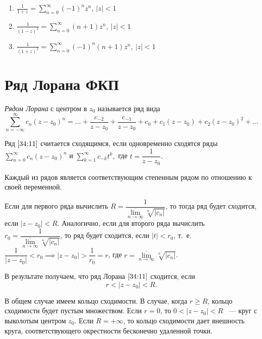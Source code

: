 \documentclass[../../main.tex]{subfiles}
\begin{document}
\begin{rems}
\begin{enumerate}
\begin{enumerate}
			\item $\displaystyle \frac{1}{1 + z} = \sum\limits_{n = 0}^{\infty} (-1)^nz^n,\  |z| < 1$
			
			\item $\displaystyle \frac{1}{(1 - z)^2} = \sum\limits_{n = 0}^{\infty} (n + 1)z^n,\ |z| < 1$
			
			\item $\displaystyle \frac{1}{(1 + z)^2} = \sum\limits_{n = 0}^{\infty} (-1)^n(n + 1)z^n,\ |z| < 1$
		\end{enumerate}
	\end{enumerate}
\end{rems}

\section{Ряд Лорана ФКП}

\emph{Рядом Лорана} с центром в $ z_0 $ называется ряд вида
\begin{equation}\label{34:11}
	\sum\limits_{n = -\infty}^{\infty}c_n(z - z_0)^n = \ldots + \frac{c_{-2}}{z - 
	z_0} + \frac{c_{-1}}{z - z_0} + c_0 + c_1(z - z_0) + c_2(z - z_0)^2 + \ldots
\end{equation}

Ряд $ \eqref{34:11} $ считается сходящимся, если одновременно сходятся ряды 
$ \sum\limits_{n = 0}^{\infty} c_n(z - z_0)^n$ и $ 
\sum\limits_{k = 1}^{\infty} c_{-k}t^k,$ где $t = \dfrac{1}{z - z_0}.$

Каждый из рядов является соответствующим степенным рядом по отношению к своей 
переменной.

Если для первого ряда вычислить $ R = \dfrac{1}{\overline{\underset{n \to 
\infty}{\lim}} \sqrt[n]{|c_n|}} $, то тогда ряд будет сходится, если $ |z - 
z_0| < R $.
Аналогично, если для второго ряда вычислить $ r_0 = 
\dfrac{1}{\overline{\underset{n \to \infty}{\lim}} \sqrt[n]{|c_n|}} $, то ряд 
будет сходится, если $ |t| < r_0 $, т.~е. $ \dfrac{1}{|z - z_0|} < r_0 \implies 
|z - z_0| > \dfrac{1}{r_0} = r $, где $ r = \overline{\underset{n \to 
\infty}{\lim}} \sqrt[n]{|c_n|} $.

В результате получаем, что ряд Лорана $ \eqref{34:11} $ сходится, если
\[ r < |z - z_0| < R. \]

В общем случае имеем кольцо сходимости.
В случае, когда $ r \geq R $, кольцо сходимости будет пустым множеством.
Если $r = 0$, то $ 0 < |z - z_0| < R $ ~--- круг с выколотым центром $z_0$.
Если $ R = +\infty $, то кольцо сходимости дает внешность круга, 
соответствующего окрестности бесконечно удаленной точки.
\end{document}
